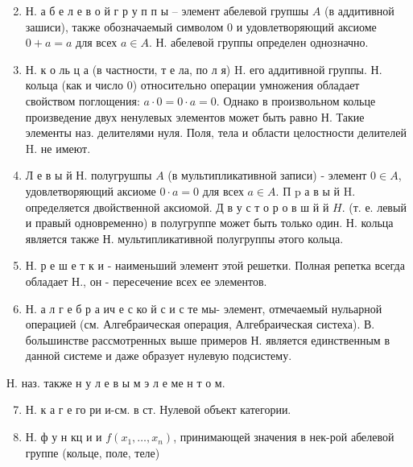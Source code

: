 \documentclass[10pt]{article}
\begin{document}
\begin{enumerate}

  \setcounter{enumi}{1}

  \item Н. а б е л е в о й г р у п п ы -- элемент абелевой групшы $A$ (в аддитивной зашиси), также обозначаемый символом 0 и удовлетворяющий аксиоме $0+a=a$ для всех $a \in A$. Н. абелевой группы определен однозначно.



  \item Н. к о ль ц а (в частности, т е ла, по л я) H. его аддитивной группы. Н. кольца (как и число 0) относительно операции умножения обладает свойством поглощения: $a \cdot 0=0 \cdot a=0$. Однако в произвольном кольце произведение двух ненулевых элементов может быть равно Н. Такие элементы наз. делителями нуля. Поля, тела и области целостности делителей H. не имеют.



  \item Л е в ы й Н. полугрушпы $A$ (в мультипликативной записи) - элемент $0 \in A$, удовлетворяющий аксиоме $0 \cdot a=0$ для всех $a \in A$. П $\mathrm{p}$ а в ы й H. определяется двойственной аксиомой. Д в у с т о р о в ш й й $H$. (т. е. левый и правый одновременно) в полугруппе может быть только один. Н. кольца является также Н. мультипликативной полугруппы әтого кольца.



  \item Н. р е ш е т к и - наименьший элемент этой решетки. Полная репетка всегда обладает Н., он - пересечение всех ее элементов.



  \item Н. а л г е б р а ич е с ко й с и с те мы- элемент, отмечаемый нульарной операцией (см. Алгебраическая операция, Алгебраическая систеха). В. большинстве рассмотренных выше примеров Н. является единственным в данной системе и даже образует нулевую подсистему.



\end{enumerate}



Н. наз. также н у л е в ы м э л е ме н т о м.



\begin{enumerate}

  \setcounter{enumi}{6}

  \item Н. к а г е го ри и-см. в ст. Нулевой объект категории.



  \item Н. ф у н кц и и $f\left(x_{1}, \ldots, x_{n}\right)$, принимающей значения в нек-рой абелевой группе (кольце, поле, теле)



\end{enumerate}
\end{document}
